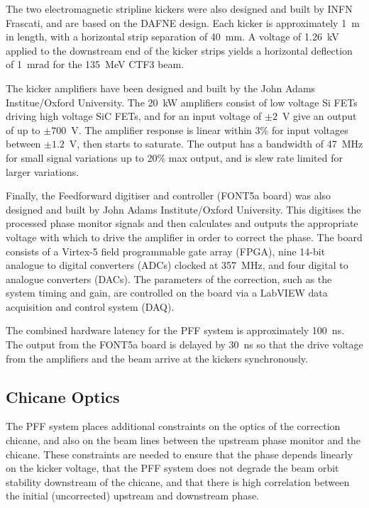 \documentclass[%
 reprint,
 amsmath,amssymb,
 prl,
]{revtex4-1}
\begin{document}
The two electromagnetic stripline kickers were also designed and built by INFN 
Frascati,  
and are based on the DAFNE design. Each kicker is approximately 1~m in length, 
with a horizontal strip separation of 40~mm. A voltage of 1.26~kV applied to 
the 
downstream end of the kicker strips yields a horizontal deflection of 1~mrad 
for the 135~MeV CTF3 beam.

The kicker amplifiers have been designed and built by the John Adams 
Institue/Oxford University. The 20~kW amplifiers consist of low voltage Si FETs 
driving high voltage SiC FETs, and for 
an input voltage of \(\pm2\)~V give an output of up to \(\pm700\)~V. The 
amplifier response is linear within 
3\% for input voltages between \(\pm1.2\)~V, then starts to saturate. The 
output 
has a bandwidth of 47~MHz for small signal variations up to 20\% max output, 
and is slew rate limited for larger variations.

Finally, the Feedforward digitiser and controller (FONT5a board) was also 
designed and built by John Adams Institute/Oxford University. This digitises 
the 
processed phase monitor signals and then calculates and outputs the appropriate 
voltage with which to drive the amplifier in order to correct the phase. The 
board consists of a Virtex-5 field programmable gate array (FPGA), nine 14-bit 
analogue to digital converters (ADCs) clocked at 357~MHz, and four digital to 
analogue converters (DACs). The parameters of the correction, such as the 
system timing and gain, are controlled on the board via a LabVIEW data 
acquisition and control system (DAQ).

The combined hardware latency for the PFF system is approximately 100~ns. The 
output from the FONT5a board is delayed by 30~ns so that the drive voltage from 
the amplifiers and the beam arrive at the kickers synchronously.

\subsection{\label{ss:optics}Chicane Optics}

The PFF system places additional constraints on the optics of the correction 
chicane, and also on the beam lines between the upstream phase monitor and the 
chicane. These constraints are needed to ensure that the phase depends linearly 
on the kicker voltage, that the PFF system does not degrade the beam 
orbit stability downstream of the chicane, and that there is high 
correlation between the initial (uncorrected) upstream and downstream phase.
\end{document}
